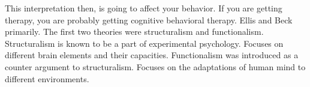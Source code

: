 \markdownRendererUlItem This interpretation then, is going to affect your behavior. If you are getting therapy, you are probably getting cognitive behavioral therapy.\markdownRendererUlItemEnd 
\markdownRendererUlItem Ellis and Beck primarily.\markdownRendererUlItemEnd 
\markdownRendererUlEndTight \markdownRendererInterblockSeparator
{}\markdownRendererInterblockSeparator
{}\markdownRendererUlBeginTight
\markdownRendererUlItem The first two theories were structuralism and functionalism.\markdownRendererUlItemEnd 
\markdownRendererUlItem Structuralism is known to be a part of experimental psychology.\markdownRendererInterblockSeparator
{}\markdownRendererUlBeginTight
\markdownRendererUlItem Focuses on different brain elements and their capacities.\markdownRendererUlItemEnd 
\markdownRendererUlEndTight \markdownRendererUlItemEnd 
\markdownRendererUlItem Functionalism was introduced as a counter argument to structuralism.\markdownRendererInterblockSeparator
{}\markdownRendererUlBeginTight
\markdownRendererUlItem Focuses on the adaptations of human mind to different environments.\markdownRendererUlItemEnd 
\markdownRendererUlEndTight \markdownRendererUlItemEnd 
\markdownRendererUlEndTight \relax